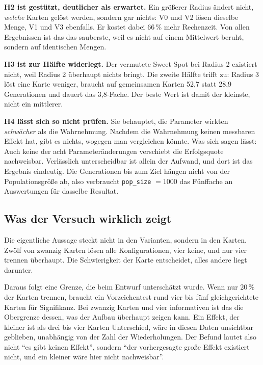 \documentclass[sigconf]{acmart}
\begin{document}
\textbf{H2 ist gestützt, deutlicher als erwartet.} Ein größerer Radius ändert nicht, \emph{welche} Karten gelöst werden, sondern gar nichts: V0 und V2 lösen dieselbe Menge, V1 und V3 ebenfalls. Er kostet dabei 66\,\% mehr Rechenzeit. Von allen Ergebnissen ist das das sauberste, weil es nicht auf einem Mittelwert beruht, sondern auf identischen Mengen.

\textbf{H3 ist zur Hälfte widerlegt.} Der vermutete Sweet Spot bei Radius 2 existiert nicht, weil Radius 2 überhaupt nichts bringt. Die zweite Hälfte trifft zu: Radius 3 löst eine Karte weniger, braucht auf gemeinsamen Karten 52,7 statt 28,9 Generationen und dauert das 3,8-Fache. Der beste Wert ist damit der kleinste, nicht ein mittlerer.

\textbf{H4 lässt sich so nicht prüfen.} Sie behauptet, die Parameter wirkten \emph{schwächer} als die Wahrnehmung. Nachdem die Wahrnehmung keinen messbaren Effekt hat, gibt es nichts, wogegen man vergleichen könnte. Was sich sagen lässt: Auch keine der acht Parameteränderungen verschiebt die Erfolgsquote nachweisbar. Verlässlich unterscheidbar ist allein der Aufwand, und dort ist das Ergebnis eindeutig. Die Generationen bis zum Ziel hängen nicht von der Populationsgröße ab, also verbraucht \texttt{pop\_size} $=1000$ das Fünffache an Auswertungen für dasselbe Resultat.

\subsection{Was der Versuch wirklich zeigt}
Die eigentliche Aussage steckt nicht in den Varianten, sondern in den Karten. Zwölf von zwanzig Karten lösen alle Konfigurationen, vier keine, und nur vier trennen überhaupt. Die Schwierigkeit der Karte entscheidet, alles andere liegt darunter.

Daraus folgt eine Grenze, die beim Entwurf unterschätzt wurde. Wenn nur 20\,\% der Karten trennen, braucht ein Vorzeichentest rund vier bis fünf gleichgerichtete Karten für Signifikanz. Bei zwanzig Karten und vier informativen ist das die Obergrenze dessen, was der Aufbau überhaupt zeigen kann. Ein Effekt, der kleiner ist als drei bis vier Karten Unterschied, wäre in diesen Daten unsichtbar geblieben, unabhängig von der Zahl der Wiederholungen. Der Befund lautet also nicht \enquote{es gibt keinen Effekt}, sondern \enquote{der vorhergesagte große Effekt existiert nicht, und ein kleiner wäre hier nicht nachweisbar}.
\end{document}
